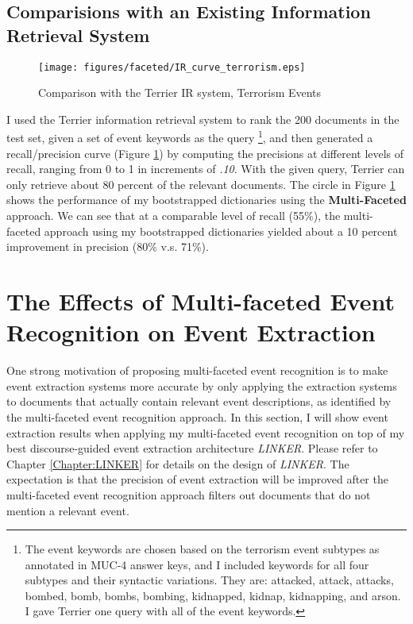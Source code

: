 \subsection{Comparisions with an Existing Information Retrieval System}

\begin{figure}[htbp]
 \centering
 \texttt{[image: figures/faceted/IR\_curve\_terrorism.eps]}
 \caption{Comparison with the Terrier IR system, Terrorism Events}
\label{IR-curve-terrorism}
\end{figure} 

I used the Terrier information retrieval system to 
rank the 200 documents in the test set, given a set of event keywords 
as the query \footnote{The event keywords are chosen based on the  
terrorism event subtypes as annotated in MUC-4 answer keys, and I included 
keywords for all four subtypes and their syntactic 
variations. They are: attacked, attack, attacks, bombed, 
bomb, bombs, bombing, kidnapped, kidnap, kidnapping, and arson.
I gave Terrier one query with all of the event keywords.}, 
and then generated a
recall/precision curve (Figure \ref{IR-curve-terrorism}) 
by computing the precisions at different levels of recall,
ranging from 0 to 1 in increments of {\it .10}. 
With the given query, Terrier can only retrieve about 
80 percent of the relevant documents. 
The circle in Figure \ref{IR-curve-terrorism} 
shows the performance of my bootstrapped dictionaries using the 
{\bf Multi-Faceted} approach. 
We can see that at a comparable level of recall (55\%), 
the multi-faceted approach using my bootstrapped dictionaries 
yielded about a 10 percent improvement in precision (80\% v.s. 71\%). 



\section{The Effects of Multi-faceted Event Recognition on Event Extraction}
\label{Chapter:Stratified}
One strong motivation of proposing multi-faceted event recognition is 
to make event extraction systems more accurate by only applying 
the extraction systems to 
documents that actually contain relevant event descriptions,  
as identified by the multi-faceted event recognition approach. 
In this section, I will show event extraction results when 
applying my multi-faceted event recognition 
on top of my best discourse-guided event extraction architecture {\it LINKER}.
Please refer to Chapter \ref{Chapter:LINKER} for details on the design of {\it LINKER}. 
The expectation is that the precision of event extraction 
will be improved after the multi-faceted event recognition 
approach filters out documents that do not mention a relevant event.

